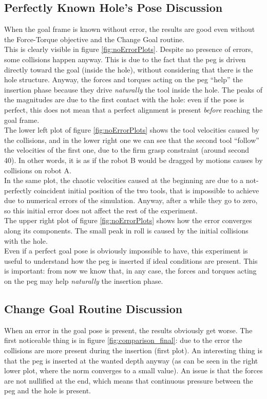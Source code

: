 \subsection{Perfectly Known Hole's Pose Discussion}
When the goal frame is known without error, the results are good even without the Force-Torque objective and the Change Goal routine.\\
This is clearly visible in figure \ref{fig:noErrorPlots}. Despite no presence of errors, some collisions happen anyway. This is due to the fact that the peg is driven  directly toward the goal (inside the hole), without considering that there is the hole structure. Anyway, the forces and torques acting on the peg \enquote{help} the insertion phase because they drive \textit{naturally} the tool inside the hole. The peaks of the magnitudes are due to the first contact with the hole: even if the pose is perfect, this does not mean that a perfect alignment is present \textit{before} reaching the goal frame.\\
 
The lower left plot of figure \ref{fig:noErrorPlots} shows the tool velocities caused by the collisions, and in the lower right one we can see that the second tool \enquote{follow} the velocities of the first one, due to the firm grasp constraint (around second 40). In other words, it is as if the robot B would be dragged by motions causes by collisions on robot A.\\
In the same plot, the chaotic velocities caused at the beginning are due to a not-perfectly coincident initial position of the two tools, that is impossible to achieve due to numerical errors of the simulation. Anyway, after a while they go to zero, so this initial error does not affect the rest of the experiment.\\

The upper right plot of figure \ref{fig:noErrorPlots} shows how the error converges along its components. The small peak in roll is caused by the initial collisions with the hole.\\

Even if a perfect goal pose is obviously impossible to have, this experiment is useful to understand how the peg is inserted if ideal conditions are present. This is important: from now we know that, in any case, the forces and torques acting on the peg may help \textit{naturally} the insertion phase.\\

\subsection{Change Goal Routine Discussion}
When an error in the goal pose is present, the results obviously get worse. The first noticeable thing is in figure \ref{fig:comparison_final}: due to the error the collisions are more present during the insertion (first plot). An interesting thing is that the peg is inserted at the wanted depth anyway (as can be seen in the right lower plot, where the norm converges to a small value). An issue is that the forces are not nullified at the end, which means that continuous pressure between the peg and the hole is present.\\

